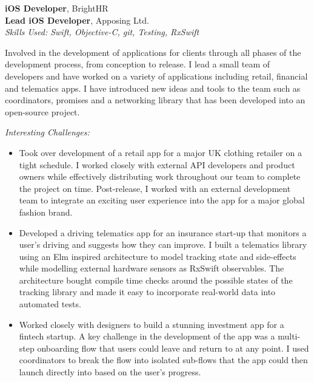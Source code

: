 %
\textbf{iOS Developer}, BrightHR \\

\textbf{Lead iOS Developer}, Apposing Ltd. \\
\textit{Skills Used: Swift, Objective-C, git, Testing, RxSwift}

Involved in the development of applications for clients through all phases of
the development process, from conception to release. I lead a small team of
developers and have worked on a variety of applications including retail,
financial and telematics apps. I have introduced new ideas and tools to the team
such as coordinators, promises and a networking library that has been developed
into an open-source project.

\medskip

\textit{Interesting Challenges:}

\smallskip

\begin{itemize}
\item Took over development of a retail app for a major UK clothing retailer on
  a tight schedule. I worked closely with external API developers and product
  owners while effectively distributing work throughout our team to complete the
  project on time. Post-release, I worked with an external development team to
  integrate an exciting user experience into the app for a major global fashion
  brand.

\item Developed a driving telematics app for an insurance start-up that monitors
  a user's driving and suggests how they can improve. I built a telematics
  library using an Elm inspired architecture to model tracking state and
  side-effects while modelling external hardware sensors as RxSwift
  observables. The architecture bought compile time checks around the possible
  states of the tracking library and made it easy to incorporate real-world data
  into automated tests.

\item Worked closely with designers to build a stunning investment app for a
  fintech startup. A key challenge in the development of the app was a
  multi-step onboarding flow that users could leave and return to at any
  point. I used coordinators to break the flow into isolated sub-flows that the
  app could then launch directly into based on the user's progress.

\end{itemize}

\bigskip

